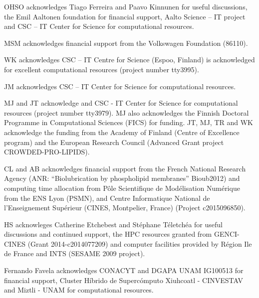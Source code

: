 \documentclass[journal=jacsat,manuscript=article]{achemso}
\begin{document}
\begin{acknowledgement}


OHSO acknowledges Tiago Ferreira and Paavo Kinnunen for useful discussions, 
the Emil Aaltonen foundation for financial support, 
Aalto Science -- IT project and CSC -- IT Center for Science for computational resources. 

MSM acknowledges financial support from the Volkswagen Foundation (86110).

WK acknowledges CSC -- IT Centre for Science (Espoo, Finland) is acknowledged for excellent computational resources (project number tty3995).

JM acknowledges CSC -- IT Center for Science for computational resources.


MJ and JT acknowledge and CSC - IT Center for Science for computational resources (project number tty3979).
MJ also acknowledges the Finnish Doctoral Programme in Computational Sciences (FICS) for funding.
JT, MJ, TR and WK acknowledge the funding from the Academy of Finland (Centre of Excellence program) 
and the European Research Council (Advanced Grant project CROWDED-PRO-LIPIDS).


CL and AB acknowledges financial support from the French National Research Agency
(ANR: “Biolubrication by phospholipid membranes” Bioub2012) and
computing time allocation from P{\^o}le Scientifique de Mod{\'e}lisation Num{\'e}rique from the ENS Lyon (PSMN),
and Centre Informatique National de l'Enseignement Sup{\'e}rieur (CINES, Montpelier, France)
(Project c2015096850).

HS acknowleges Catherine Etchebest and St\'ephane T\'eletch\'ea for useful discussions and continued support, the HPC resources granted from GENCI-CINES (Grant 2014-c2014077209) and computer facilities provided by R\'egion Ile de France and INTS (SESAME 2009 project).

Fernando Favela acknowledges CONACYT and DGAPA UNAM IG100513
for financial support, Cluster H\'ibrido de Superc\'omputo Xiuhcoatl - CINVESTAV and Miztli - UNAM for computational resources. 

\end{acknowledgement}
\end{document}
